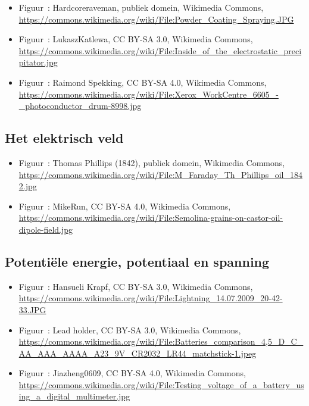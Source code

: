 \documentclass{ximera}
\begin{document}
\begin{itemize}
        \item Figuur~: Hardcoreraveman, publiek domein, Wikimedia Commons, \url{https://commons.wikimedia.org/wiki/File:Powder_Coating_Spraying.JPG}
        \item Figuur~: LukaszKatlewa, CC BY-SA 3.0, Wikimedia Commons, \url{https://commons.wikimedia.org/wiki/File:Inside_of_the_electrostatic_precipitator.jpg}
        \item Figuur~: Raimond Spekking, CC BY-SA 4.0, Wikimedia Commons, \url{https://commons.wikimedia.org/wiki/File:Xerox_WorkCentre_6605_-_photoconductor_drum-8998.jpg}
\end{itemize}

\subsection*{Het elektrisch veld}
\begin{itemize}
        \item Figuur~: Thomas Phillips (1842), publiek domein, Wikimedia Commons, \url{https://commons.wikimedia.org/wiki/File:M_Faraday_Th_Phillips_oil_1842.jpg}
        \item Figuur~: MikeRun, CC BY-SA 4.0, Wikimedia Commons, \url{https://commons.wikimedia.org/wiki/File:Semolina-grains-on-castor-oil-dipole-field.jpg}
\end{itemize}

\subsection*{Potentiële energie, potentiaal en spanning}
\begin{itemize}
        \item Figuur~: Hansueli Krapf, CC BY-SA 3.0, Wikimedia Commons, \url{https://commons.wikimedia.org/wiki/File:Lightning_14.07.2009_20-42-33.JPG}
        \item Figuur~: Lead holder, CC BY-SA 3.0, Wikimedia Commons, \url{https://commons.wikimedia.org/wiki/File:Batteries_comparison_4,5_D_C_AA_AAA_AAAA_A23_9V_CR2032_LR44_matchstick-1.jpeg}
        \item Figuur~: Jiazheng0609, CC BY-SA 4.0, Wikimedia Commons, \url{https://commons.wikimedia.org/wiki/File:Testing_voltage_of_a_battery_using_a_digital_multimeter.jpg}
\end{itemize}
\end{document}
